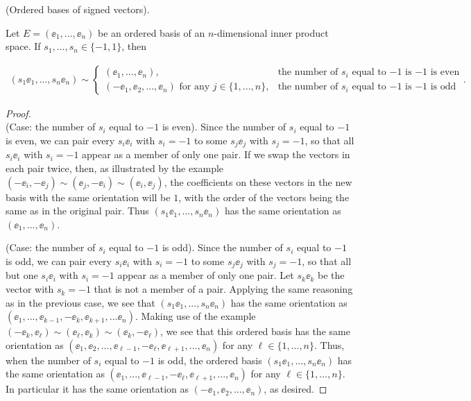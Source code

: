 \begin{theorem}
    \label{ch::lin_alg::thm::antisymmetry_ordered_bases_signs}

    (Ordered bases of signed vectors).
    
    Let $E = (\ee_1, ..., \ee_n)$ be an ordered basis of an $n$-dimensional inner product space. If $s_1, ..., s_n \in \{-1, 1\}$, then

    \begin{align*}
        (s_1 \ee_1, ..., s_n \ee_n) \sim
        \begin{cases}
            (\ee_1, ..., \ee_n), & \text{the number of $s_i$ equal to $-1$ is $-1$ is even} \\
            (-\ee_1, \ee_2, ..., \ee_n) \text{ for any $j \in \{1, ..., n\}$}, & \text{the number of $s_i$ equal to $-1$ is $-1$ is odd} 
        \end{cases}.
    \end{align*}
\end{theorem}

\begin{proof}
    \mbox{} \\
    
    (Case: the number of $s_i$ equal to $-1$ is even). Since the number of $s_i$ equal to $-1$ is even, we can pair every $s_i \ee_i$ with $s_i = -1$ to some $s_j \ee_j$ with $s_j = -1$, so that all $s_i \ee_i$ with $s_i = -1$ appear as a member of only one pair. If we swap the vectors in each pair twice, then, as illustrated by the example $(-\ee_i, -\ee_j) \sim (\ee_j, -\ee_i) \sim (\ee_i, \ee_j)$, the coefficients on these vectors in the new basis with the same orientation will be $1$, with the order of the vectors being the same as in the original pair. Thus $(s_1 \ee_1, ..., s_n \ee_n)$ has the same orientation as $(\ee_1, ..., \ee_n)$.

    (Case: the number of $s_i$ equal to $-1$ is odd). Since the number of $s_i$ equal to $-1$ is odd, we can pair every $s_i \ee_i$ with $s_i = -1$ to some $s_j \ee_j$ with $s_j = -1$, so that all but one $s_i \ee_i$ with $s_i = -1$ appear as a member of only one pair. Let $s_k \ee_k$ be the vector with $s_k = -1$ that is not a member of a pair. Applying the same reasoning as in the previous case, we see that $(s_1 \ee_1, ..., s_n \ee_n)$ has the same orientation as $(\ee_1, ..., \ee_{k - 1}, -\ee_k, \ee_{k + 1}, ... \ee_n)$. Making use of the example $(-\ee_k, \ee_\ell) \sim (\ee_\ell, \ee_k) \sim (\ee_k, -\ee_\ell)$, we see that this ordered basis has the same orientation as $(\ee_1, \ee_2, ..., \ee_{\ell - 1}, -\ee_\ell, \ee_{\ell + 1}, ..., \ee_n)$ for any $\ell \in \{1, ..., n\}$. Thus, when the number of $s_i$ equal to $-1$ is odd, the ordered basis $(s_1 \ee_1, ..., s_n \ee_n)$ has the same orientation as $(\ee_1, ..., \ee_{\ell - 1}, -\ee_\ell, \ee_{\ell + 1}, ..., \ee_n)$ for any $\ell \in \{1, ..., n\}$. In particular it has the same orientation as $(-\ee_1, \ee_2, ..., \ee_n)$, as desired.
\end{proof}

